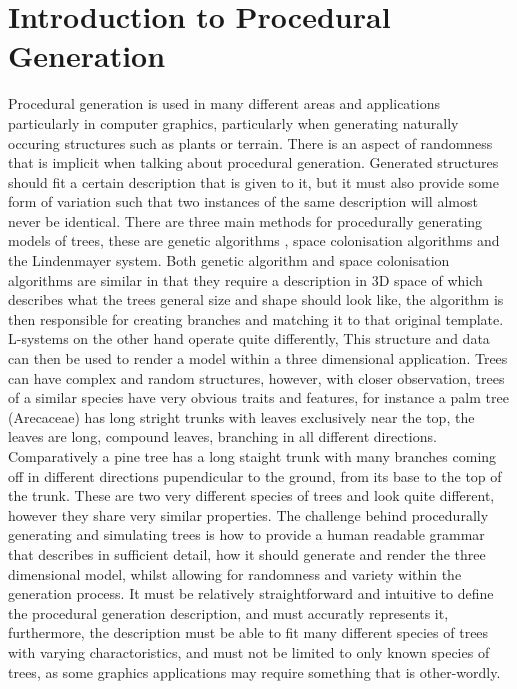 \section{Introduction to Procedural Generation}

\begin{flushleft}

Procedural generation is used in many different areas and applications particularly in computer graphics, particularly when generating naturally occuring structures such as plants or terrain. There is an aspect of randomness that is implicit when talking about procedural generation. Generated structures should fit a certain description that is given to it, but it must also provide some form of variation such that two instances of the same description will almost never be identical. There are three main methods for procedurally generating models of trees, these are genetic algorithms \cite{haubenwallner2017shapegenetics}, space colonisation algorithms\cite{juuso2017procedural} and the Lindenmayer system. Both genetic algorithm and space colonisation algorithms are similar in that they require a description in 3D space of which describes what the trees general size and shape should look like, the algorithm is then responsible for creating branches and matching it to that original template. L-systems on the other hand operate quite differently,  This structure and data can then be used to render a model within a three dimensional application. Trees can have complex and random structures, however, with closer observation, trees of a similar species have very obvious traits and features, for instance a palm tree (Arecaceae) has long stright trunks with leaves exclusively near the top, the leaves are long, compound leaves, branching in all different directions. Comparatively a pine tree has a long staight trunk with many branches coming off in different directions pupendicular to the ground, from its base to the top of the trunk. These are two very different species of trees and look quite different, however they share very similar properties. The challenge behind procedurally generating and simulating trees is how to provide a human readable grammar that describes in sufficient detail, how it should generate and render the three dimensional model, whilst allowing for randomness and variety within the generation process. It must be relatively straightforward and intuitive to define the procedural generation description, and must accuratly represents it, furthermore, the description must be able to fit many different species of trees with varying charactoristics, and must not be limited to only known species of trees, as some graphics applications may require something that is other-wordly.

\end{flushleft}

